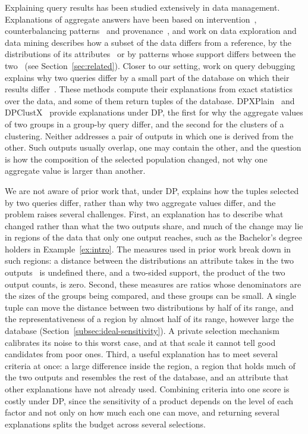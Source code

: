 Explaining query results has been studied extensively in data management.
Explanations of aggregate answers have been based on intervention~\cite{RoyS14,wu2013}, counterbalancing patterns~\cite{MZGR19} and provenance~\cite{buneman2001,herschel2017}, and work on data exploration and data mining describes how a subset of the data differs from a reference, by the distributions of its attributes~\cite{SeeDB,FEDEX} or by patterns whose support differs between the two~\cite{BayPazzani01,MacroBase} (see Section~\ref{sec:related}).
Closer to our setting, work on query debugging explains why two queries differ by a small part of the database on which their results differ~\cite{MiaoRY19}.
These methods compute their explanations from exact statistics over the data, and some of them return tuples of the database.
DPXPlain~\cite{TaoGMR22} and DPClustX~\cite{DPClustX} provide explanations under DP, the first for why the aggregate values of two groups in a group-by query differ, and the second for the clusters of a clustering.
Neither addresses a pair of outputs in which one is derived from the other.
Such outputs usually overlap, one may contain the other, and the question is how the composition of the selected population changed, not why one aggregate value is larger than another.

We are not aware of prior work that, under DP, explains how the tuples selected by two queries differ, rather than why two aggregate values differ, and the problem raises several challenges.
First, an explanation has to describe what changed rather than what the two outputs share, and much of the change may lie in regions of the data that only one output reaches, such as the Bachelor's degree holders in Example~\ref{ex:intro}.
The measures used in prior work break down in such regions: a distance between the distributions an attribute takes in the two outputs~\cite{SeeDB,FEDEX} is undefined there, and a two-sided support, the product of the two output counts, is zero.
Second, these measures are ratios whose denominators are the sizes of the groups being compared, and these groups can be small.
A single tuple can move the distance between two distributions by half of its range, and the representativeness of a region by almost half of its range, however large the database (Section~\ref{subsec:ideal-sensitivity}).
A private selection mechanism calibrates its noise to this worst case, and at that scale it cannot tell good candidates from poor ones.
Third, a useful explanation has to meet several criteria at once: a large difference inside the region, a region that holds much of the two outputs and resembles the rest of the database, and an attribute that other explanations have not already used.
Combining criteria into one score is costly under DP, since the sensitivity of a product depends on the level of each factor and not only on how much each one can move, and returning several explanations splits the budget across several selections.

